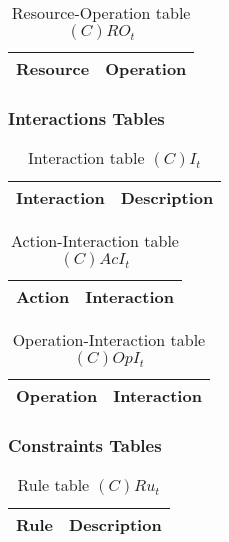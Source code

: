 \begin{table}[H]
	\centering
	\begin{tabular}{|p{4cm}|p{8cm}|}
			\hline
			\textbf{Resource} & \textbf{Operation} \\
			\hline
		\end{tabular}
	\caption{Resource-Operation table $(C)RO_t$}
	\label{tab:crot}
\end{table}

\subsubsection{Interactions Tables}

\begin{table}[H]
	\centering
	\begin{tabular}{|p{4cm}|p{8cm}|}
			\hline
			\textbf{Interaction} & \textbf{Description} \\
			\hline
		\end{tabular}
	\caption{Interaction table $(C)I_t$}
	\label{tab:cit}
\end{table}

\begin{table}[H]
	\centering
	\begin{tabular}{|p{4cm}|p{8cm}|}
			\hline
			\textbf{Action} & \textbf{Interaction} \\
			\hline
		\end{tabular}
	\caption{Action-Interaction table $(C)AcI_t$}
	\label{tab:cacit}
\end{table}

\begin{table}[H]
	\centering
	\begin{tabular}{|p{4cm}|p{8cm}|}
			\hline
			\textbf{Operation} & \textbf{Interaction} \\
			\hline
		\end{tabular}
	\caption{Operation-Interaction table $(C)OpI_t$}
	\label{tab:opit}
\end{table}

\subsubsection{Constraints Tables}

\begin{table}[H]
	\centering
	\begin{tabular}{|p{4cm}|p{8cm}|}
			\hline
			\textbf{Rule} & \textbf{Description} \\
			\hline
		\end{tabular}
	\caption{Rule table $(C)Ru_t$}
	\label{tab:crut}
\end{table}

